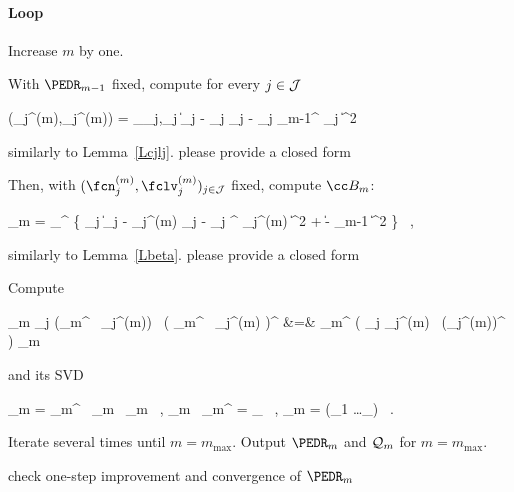 \paragraph{Loop}
\begin{mylist}

\item 
Increase \( m \) by one. 

\item
With \( \PEDR_{m-1} \) fixed, compute for every \( j \in \mathcal{J} \)
\begin{EQA}[c]
	(\fcn_{j}^{(m)},\fclv_{j}^{(m)})
	=
	\arginf_{\fcn_{j},\fclv_{j}} \bigl\| \Imav_{j} - \fcn_{j} \Sv_{j} - \UV_{j} \PEDR_{m-1}^{\T} \fclv_{j} \bigr\|^{2}
\end{EQA}
similarly to Lemma~\ref{Lcjlj}.
{\color{blue} please provide a closed form}

\item 
Then, with \( (\fcn_{j}^{(m)},\fclv_{j}^{(m)})_{j \in \JJJ} \) fixed, compute \( \BEDR_{m} \):
\begin{EQA}[c]
	\BEDR_{m}
	=
	\arginf_{\BEDR \in \R^{\dimd \times \dimm}} 
		\biggl\{ \sum_{j \in \JJJ} \bigl\| \Imav_{j} - \fcn_{j}^{(m)} \Sv_{j} - \UV_{j} \BEDR^{\T} \fclv_{j}^{(m)} \bigr\|^{2}
	+ \lambda \| \BEDR - \PEDR_{m-1} \|^{2} 
	\biggr\}	
	\, ,
\end{EQA}
similarly to Lemma~\ref{Lbeta}. {\color{blue} please provide a closed form}

\item
Compute 
\begin{EQA}[rcl]
	\JEDR_{m}
	\eqdef
	\sum_{j \in \JJJ} (\BEDR_{m}^{\T} \, \fclv_{j}^{(m)}) \, \bigl( \BEDR_{m}^{\T} \, \fclv_{j}^{(m)} \bigr)^{\T}
	&=&
	\BEDR_{m}^{\T} \Bigl( \sum_{j \in \JJJ} {\fclv}_{j}^{(m)} \, ({\fclv}_{j}^{(m)})^{\T} \Bigr) \BEDR_{m}
\end{EQA}
and its SVD
\begin{EQA}[c]
	\JEDR_{m}
	=
	\PEDR_{m}^{\T} \, \Lambda_{m} \, \PEDR_{m}
	\, ,
	\qquad
	\PEDR_{m} \, \PEDR_{m}^{\T}
	= 
	\Id_{\dimm}
	\, ,
	\qquad
	\Lambda_{m} = \diag(\lambda_{1} \geq \ldots \geq \lambda_{\dimm})
	\, .
\end{EQA}

\item 
Iterate several times until \( m=m_{\max} \).
Output \( \PEDR_{m} \) and \( \mathcal{Q}_{m} \) for \( m = m_{\max} \).
\end{mylist}

{\color{blue} check one-step improvement and convergence of \( \PEDR_{m} \)}



